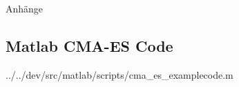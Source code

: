 ﻿%
%
%
%

\begin{appendix}
\newpage
\huge{Anhänge}
\normalsize
\thispagestyle{plain}

\newpage
\begin{landscape}
\thispagestyle{plain}
\section{Matlab CMA-ES Code}
\label{lst:cmaes-mat-code}



		{../../dev/src/matlab/scripts/cma_es_examplecode.m}

\end{landscape}

%
%
%

\end{appendix}
